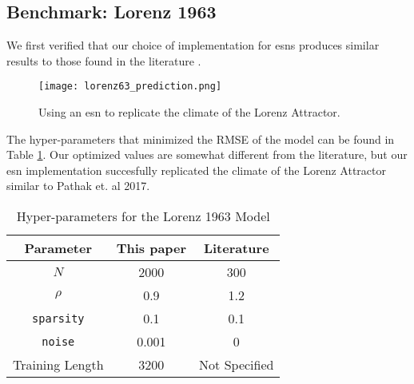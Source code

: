 \subsection{Benchmark: Lorenz 1963}

We first verified that our choice of implementation for \glspl{esn}
produces similar results to those found in the literature \cite{pathak_using_2017}.
\begin{figure}[ht]
  \texttt{[image: lorenz63\_prediction.png]}
  \caption{Using an \gls{esn} to replicate the climate of the Lorenz Attractor.}
  \label{fig:lorenz63}
\end{figure}
The hyper-parameters that minimized the RMSE of the model can be found in Table
\ref{tab:lorenzparam}. Our optimized values are somewhat different from the literature, but our \gls{esn} implementation succesfully
replicated the climate of the Lorenz Attractor similar to Pathak et. al 2017.
\begin{table}[ht]
  \centering
  \caption{Hyper-parameters for the Lorenz 1963 Model}
  \label{tab:lorenzparam}
  \begin{tabular}{c|c|c}
    \hline
    Parameter & This paper & Literature \cite{pathak_using_2017}\\
    \hline
    $N$ & 2000& 300\\
    $\rho$& 0.9&1.2\\
    \texttt{sparsity}& 0.1& 0.1\\
    \texttt{noise}& 0.001& 0\\
    Training Length & 3200& Not Specified\\
  \end{tabular}
\end{table}
